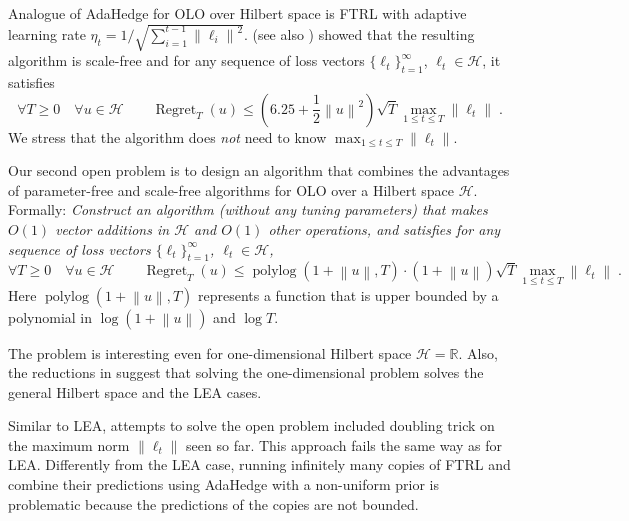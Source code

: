 \documentclass{colt2016} %
\DeclareMathOperator{\Regret}{Regret}
\DeclareMathOperator{\polylog}{polylog}
\newcommand{\R}{\mathbb{R}}     %
\renewcommand{\H}{\mathcal{H}}  %
\newcommand{\norm}[1]{\left\|{#1}\right\|}
\begin{document}
Analogue of AdaHedge for OLO over Hilbert space is FTRL with adaptive learning
rate $\eta_t = 1/\sqrt{\sum_{i=1}^{t-1} \norm{\ell_i}^2}$.
\cite{Orabona-Pal-2015} (see also \cite{Orabona-Pal-2016-scale-free}) showed
that the resulting algorithm is scale-free and for any sequence of loss vectors
$\{\ell_t\}_{t=1}^\infty$, $\ell_t \in \H$, it satisfies
$$
\forall T \ge 0 \quad \forall u \in \H \qquad \Regret_T(u) \le \left(6.25 + \frac{1}{2}\norm{u}^2 \right) \sqrt{T} \max_{1 \le t \le T} \norm{\ell_t} \; .
$$
We stress that the algorithm does \emph{not} need to know $\max_{1 \le t \le T}
\norm{\ell_t}$.

Our second open problem is to design an algorithm that combines the advantages
of parameter-free and scale-free algorithms for OLO over a Hilbert space $\H$.
Formally: \emph{Construct an algorithm (without any tuning parameters) that
makes $O(1)$ vector additions in $\H$ and $O(1)$ other operations, and
satisfies for any sequence of loss vectors $\{\ell_t\}_{t=1}^\infty$, $\ell_t
\in \H$,}
$$
\forall T \ge 0 \quad \forall u \in \H \qquad
\Regret_T(u) \le \polylog(1 + \norm{u}, T) \cdot (1 + \norm{u}) \sqrt{T} \max_{1 \le t \le T} \norm{\ell_t} \; .
$$
Here $\polylog(1 + \norm{u}, T)$ represents a function that is upper bounded by
a polynomial in $\log(1+\norm{u})$ and $\log T$.

The problem is
interesting even for one-dimensional Hilbert space $\H = \R$. Also, the
reductions in \cite{Orabona-Pal-2016-parameter-free} suggest that solving the
one-dimensional problem solves the general Hilbert space and the LEA cases.

Similar to LEA, attempts to solve the open problem included doubling trick on
the maximum norm $\norm{\ell_t}$ seen so far. This approach fails the same way
as for LEA. Differently from the LEA case, running infinitely many copies of FTRL
and combine their predictions using AdaHedge with a non-uniform prior is problematic because the predictions of the copies are not bounded.


\end{document}
